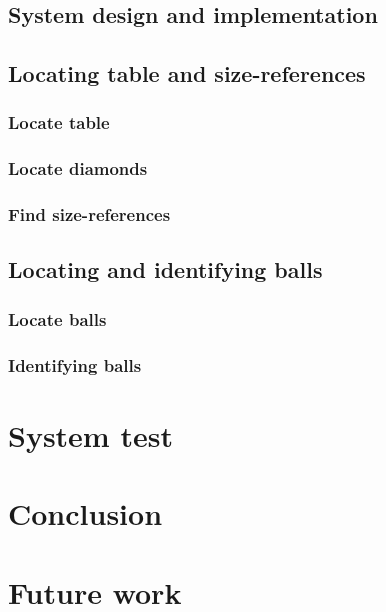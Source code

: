 	\section{System design and implementation}
		\label{sec:sysdesign}
		
		
	\section{Locating table and size-references}
		\label{sec:table-intro}	
			
		
			\subsection{Locate table}
				\label{sec:table-locate}
				
		
			\subsection{Locate diamonds}
				\label{sec:table-diamonds}
				
		
			\subsection{Find size-references}
				\label{sec:table-sizes}
				

	\section{Locating and identifying balls}
		\label{sec:balls-intro}	
			
		
			\subsection{Locate balls}
				\label{sec:balls-locate}
				
		
			\subsection{Identifying balls}
				\label{sec:balls-id}
				

\chapter{System test}
	\label{sec:system-test}
	
	
\chapter{Conclusion}
	\label{sec:conclusion}
	
	
\chapter{Future work}
	\label{sec:futurework}
	




